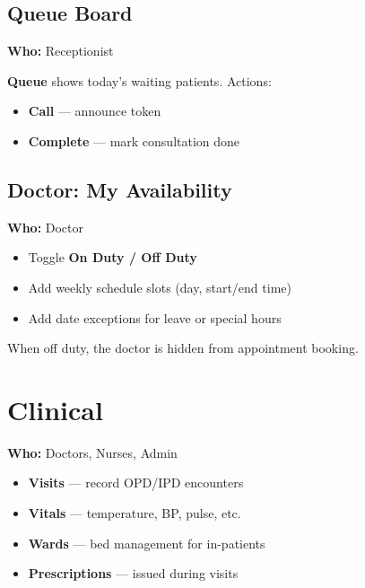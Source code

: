 \documentclass[11pt,a4paper]{report}
\begin{document}
\section{Queue Board}

\textbf{Who:} Receptionist

\textbf{Queue} shows today's waiting patients. Actions:
\begin{itemize}[noitemsep]
    \item \textbf{Call} --- announce token
    \item \textbf{Complete} --- mark consultation done
\end{itemize}

\section{Doctor: My Availability}

\textbf{Who:} Doctor

\begin{itemize}[noitemsep]
    \item Toggle \textbf{On Duty / Off Duty}
    \item Add weekly schedule slots (day, start/end time)
    \item Add date exceptions for leave or special hours
\end{itemize}

When off duty, the doctor is hidden from appointment booking.

\chapter{Clinical}

\textbf{Who:} Doctors, Nurses, Admin

\begin{itemize}[noitemsep]
    \item \textbf{Visits} --- record OPD/IPD encounters
    \item \textbf{Vitals} --- temperature, BP, pulse, etc.
    \item \textbf{Wards} --- bed management for in-patients
    \item \textbf{Prescriptions} --- issued during visits
\end{itemize}

\end{document}
